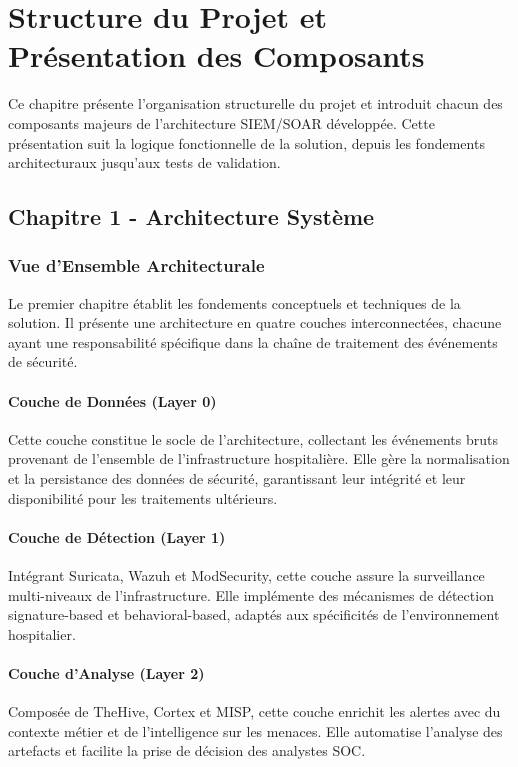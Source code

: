 \chapter{Structure du Projet et Présentation des Composants}

Ce chapitre présente l'organisation structurelle du projet et introduit chacun des composants majeurs de l'architecture SIEM/SOAR développée. Cette présentation suit la logique fonctionnelle de la solution, depuis les fondements architecturaux jusqu'aux tests de validation.

\section{Chapitre 1 - Architecture Système}

\subsection{Vue d'Ensemble Architecturale}

Le premier chapitre établit les fondements conceptuels et techniques de la solution. Il présente une architecture en quatre couches interconnectées, chacune ayant une responsabilité spécifique dans la chaîne de traitement des événements de sécurité.

\subsubsection{Couche de Données (Layer 0)}
Cette couche constitue le socle de l'architecture, collectant les événements bruts provenant de l'ensemble de l'infrastructure hospitalière. Elle gère la normalisation et la persistance des données de sécurité, garantissant leur intégrité et leur disponibilité pour les traitements ultérieurs.

\subsubsection{Couche de Détection (Layer 1)}
Intégrant Suricata, Wazuh et ModSecurity, cette couche assure la surveillance multi-niveaux de l'infrastructure. Elle implémente des mécanismes de détection signature-based et behavioral-based, adaptés aux spécificités de l'environnement hospitalier.

\subsubsection{Couche d'Analyse (Layer 2)}
Composée de TheHive, Cortex et MISP, cette couche enrichit les alertes avec du contexte métier et de l'intelligence sur les menaces. Elle automatise l'analyse des artefacts et facilite la prise de décision des analystes SOC.

